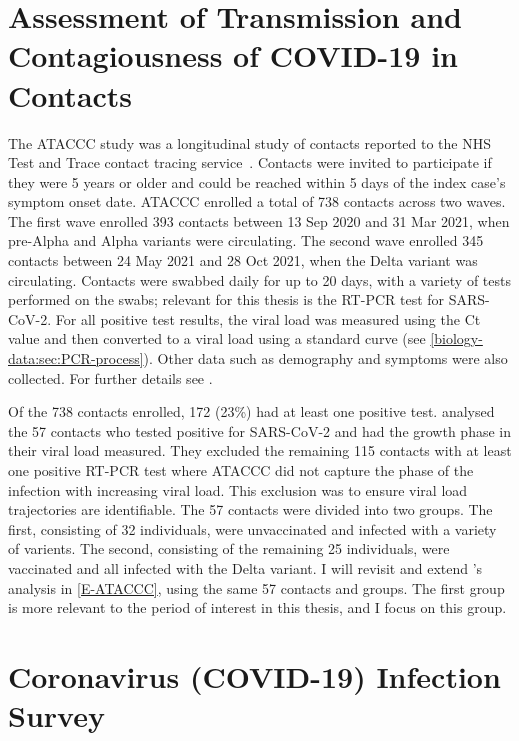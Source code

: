\documentclass[thesis.tex]{subfiles}
\begin{document}
\section{Assessment of Transmission and Contagiousness of COVID-19 in Contacts} \label{biology-data:sec:ataccc}

The ATACCC study was a longitudinal study of contacts reported to the NHS Test and Trace contact tracing service~\autocite{hakkiOnset}.
Contacts were invited to participate if they were 5 years or older and  could be reached within 5 days of the index case's symptom onset date.
ATACCC enrolled a total of 738 contacts across two waves.
The first wave enrolled 393 contacts between 13 Sep 2020 and 31 Mar 2021, when pre-Alpha and Alpha variants were circulating.
The second wave enrolled 345 contacts between 24 May 2021 and 28 Oct 2021, when the Delta variant was circulating.
Contacts were swabbed daily for up to 20 days, with a variety of tests performed on the swabs; relevant for this thesis is the RT-PCR test for SARS-CoV-2.
For all positive test results, the viral load was measured using the Ct value and then converted to a viral load using a standard curve (see \cref{biology-data:sec:PCR-process}).
Other data such as demography and symptoms were also collected.
For further details see \textcite{singanayagamDuration,hakkiOnset}.

Of the 738 contacts enrolled, 172 (23\%) had at least one positive test.
\Textcite{hakkiOnset} analysed the 57 contacts who tested positive for SARS-CoV-2 and had the growth phase in their viral load measured.
They excluded the remaining 115 contacts with at least one positive RT-PCR test where ATACCC did not capture the phase of the infection with increasing viral load.
This exclusion was to ensure viral load trajectories are identifiable.
The 57 contacts were divided into two groups.
The first, consisting of 32 individuals, were unvaccinated and infected with a variety of varients.
The second, consisting of the remaining 25 individuals, were vaccinated and all infected with the Delta variant.
I will revisit and extend \textcite{hakkiOnset}'s analysis in \cref{E-ATACCC}, using the same 57 contacts and groups.
The first group is more relevant to the period of interest in this thesis, and I focus on this group.

\section{Coronavirus (COVID-19) Infection Survey} \label{intro:sec:cis}
\end{document}
